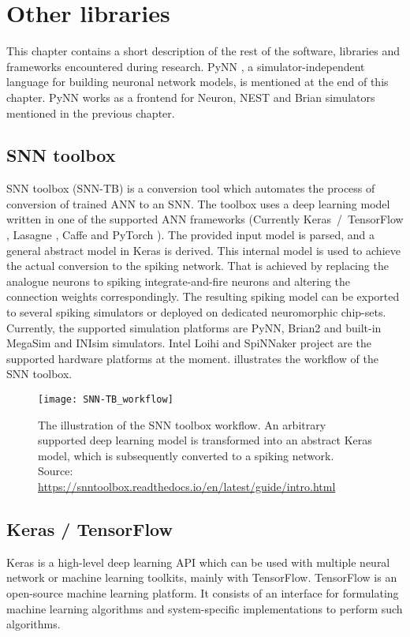 \chapter{Other libraries} \label{chap:04}

This chapter contains a short description of the rest of the software, libraries and frameworks encountered during research. PyNN \cite{davisonPyNNCommonInterface2009}, a simulator-independent language for building neuronal network models, is mentioned at the end of this chapter. PyNN works as a frontend for Neuron, NEST and Brian simulators mentioned in the previous chapter.

\section{SNN toolbox}
SNN toolbox (SNN-TB) \cite{rueckauerConversionContinuousValuedDeep2017} is a conversion tool which automates the process of conversion of trained ANN to an SNN. The toolbox uses a deep learning model written in one of the supported ANN frameworks (Currently Keras~/~TensorFlow \cite{cholletKeras15}, Lasagne \cite{sanderdielemanLasagneFirst15}, Caffe \cite{jiaCaffeConvolutional14} and PyTorch \cite{paszkePyTorchImperative19}). The provided input model is parsed, and a general abstract model in Keras is derived. This internal model is used to achieve the actual conversion to the spiking network. That is achieved by replacing the analogue neurons to spiking integrate-and-fire neurons and altering the connection weights correspondingly. The resulting spiking model can be exported to several spiking simulators or deployed on dedicated neuromorphic chip-sets. Currently, the supported simulation platforms are PyNN, Brian2 and built-in MegaSim and INIsim simulators. Intel Loihi and SpiNNaker project are the supported hardware platforms at the moment.  illustrates the workflow of the SNN toolbox.

\begin{figure}[htbp]
    \centering
    \texttt{[image: SNN-TB\_workflow]}
    \caption{The illustration of the SNN toolbox workflow. An arbitrary supported deep learning model is transformed into an abstract Keras model, which is subsequently converted to a spiking network.
    Source: \url{https://snntoolbox.readthedocs.io/en/latest/guide/intro.html}}
    \label{fig:snn-tb_workflow}
\end{figure}

\section{Keras / TensorFlow}
Keras is a high-level deep learning API which can be used with multiple neural network or machine learning toolkits, mainly with TensorFlow. TensorFlow is an open-source machine learning platform. It consists of an interface for formulating machine learning algorithms and system-specific implementations to perform such algorithms.

